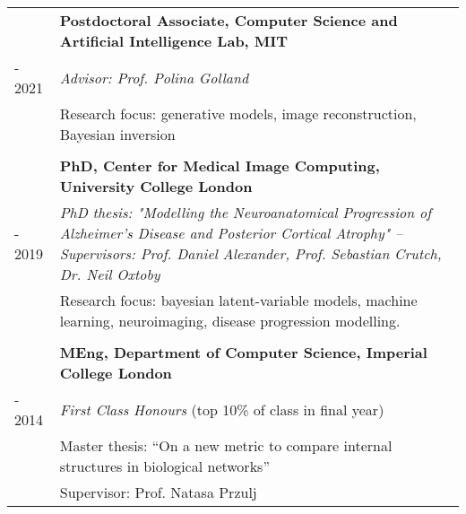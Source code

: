 \documentclass[a4paper,10pt]{article} %
\begin{document}
\begin{tabular}{>{\raggedleft\arraybackslash} p{0.93cm}|p{15.7cm}}
2019 & \large\textbf{Postdoctoral Associate, Computer Science and Artificial Intelligence Lab, MIT} \\
- 2021 & \emph{Advisor: Prof. Polina Golland}\\
& Research focus: generative models, image reconstruction, Bayesian inversion\\

&\\

2014 & \large\textbf{PhD, Center for Medical Image Computing, University College London}\\
- 2019 & \emph{PhD thesis: "Modelling the Neuroanatomical Progression of
Alzheimer’s Disease and Posterior Cortical Atrophy" -- \small Supervisors: Prof. Daniel Alexander, Prof. Sebastian Crutch, Dr. Neil Oxtoby}\\

& Research focus: bayesian latent-variable models, machine learning, neuroimaging, disease progression modelling.\\

\\
2010 & \large\textbf{MEng, Department of  Computer Science, Imperial College London}\\
- 2014 & \emph{First Class Honours} (top 10\% of class in final year) \\
& Master thesis: ``On a new metric to compare internal structures in biological
networks''\\
& \small Supervisor: Prof. Natasa Przulj\\
\end{tabular}


\end{document}
